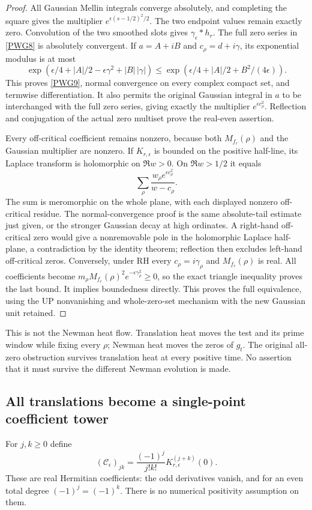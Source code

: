 \documentclass[11pt,a4paper]{article}
\theoremstyle{definition}\newtheorem{definition}[theorem]{Definition}
\begin{document}
\begin{proof}
All Gaussian Mellin integrals converge absolutely, and completing the square gives the multiplier $e^{\epsilon(s-1/2)^2/2}$. The two endpoint values remain exactly zero. Convolution of the two smoothed slots gives $\gamma_\epsilon*h_r$. The full zero series in \eqref{PWG8} is absolutely convergent. If $a=A+iB$ and $c_\rho=d+i\gamma$, its exponential modulus is at most
\[
 \exp(\epsilon/4+|A|/2-\epsilon\gamma^2+|B|\,|\gamma|)
 \le\exp(\epsilon/4+|A|/2+B^2/(4\epsilon)).
\]
This proves \eqref{PWG9}, normal convergence on every complex compact set, and termwise differentiation. It also permits the original Gaussian integral in $a$ to be interchanged with the full zero series, giving exactly the multiplier $e^{\epsilon c_\rho^2}$. Reflection and conjugation of the actual zero multiset prove the real-even assertion.

Every off-critical coefficient remains nonzero, because both $M_{f_r}(\rho)$ and the Gaussian multiplier are nonzero. If $K_{r,\epsilon}$ is bounded on the positive half-line, its Laplace transform is holomorphic on $\Re w>0$. On $\Re w>1/2$ it equals
\[
 \sum_\rho\frac{w_\rho e^{\epsilon c_\rho^2}}{w-c_\rho}.
\]
The sum is meromorphic on the whole plane, with each displayed nonzero off-critical residue. The normal-convergence proof is the same absolute-tail estimate just given, or the stronger Gaussian decay at high ordinates. A right-hand off-critical zero would give a nonremovable pole in the holomorphic Laplace half-plane, a contradiction by the identity theorem; reflection then excludes left-hand off-critical zeros. Conversely, under RH every $c_\rho=i\gamma_\rho$ and $M_{f_r}(\rho)$ is real. All coefficients become $m_\rho M_{f_r}(\rho)^2e^{-\epsilon\gamma_\rho^2}\ge0$, so the exact triangle inequality proves the last bound. It implies boundedness directly. This proves the full equivalence, using the UP nonvanishing and whole-zero-set mechanism with the new Gaussian unit retained.
\end{proof}

This is not the Newman heat flow. Translation heat moves the test and its prime window while fixing every $\rho$; Newman heat moves the zeros of $g_t$. The original all-zero obstruction survives translation heat at every positive time. No assertion that it must survive the different Newman evolution is made.

\subsection{All translations become a single-point coefficient tower}
For $j,k\ge0$ define
\begin{equation}
 (\mathcal C_\epsilon)_{jk}
   =\frac{(-1)^j}{j!k!}K_{r,\epsilon}^{(j+k)}(0).
                                                               \tag{PWG11}\label{PWG11}
\end{equation}
These are real Hermitian coefficients: the odd derivatives vanish, and for an even total degree $(-1)^j=(-1)^k$. There is no numerical positivity assumption on them.
\end{document}
